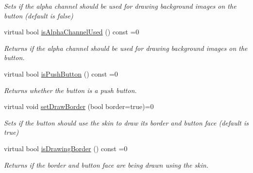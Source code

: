 \begin{DoxyCompactItemize}
\begin{DoxyCompactList}\small\item\em Sets if the alpha channel should be used for drawing background images on the button (default is false) \end{DoxyCompactList}\item 
\mbox{\label{classirr_1_1gui_1_1IGUIButton_af4cb47805f2a296506b8a0b4cb65fddf}} 
virtual bool \hyperlink{classirr_1_1gui_1_1IGUIButton_af4cb47805f2a296506b8a0b4cb65fddf}{is\+Alpha\+Channel\+Used} () const =0
\begin{DoxyCompactList}\small\item\em Returns if the alpha channel should be used for drawing background images on the button. \end{DoxyCompactList}\item 
\mbox{\label{classirr_1_1gui_1_1IGUIButton_abb12a92ba70d1fe738655d04ef73734f}} 
virtual bool \hyperlink{classirr_1_1gui_1_1IGUIButton_abb12a92ba70d1fe738655d04ef73734f}{is\+Push\+Button} () const =0
\begin{DoxyCompactList}\small\item\em Returns whether the button is a push button. \end{DoxyCompactList}\item 
\mbox{\label{classirr_1_1gui_1_1IGUIButton_aa6e68e5335f67472bde80b530b6d31fd}} 
virtual void \hyperlink{classirr_1_1gui_1_1IGUIButton_aa6e68e5335f67472bde80b530b6d31fd}{set\+Draw\+Border} (bool border=true)=0
\begin{DoxyCompactList}\small\item\em Sets if the button should use the skin to draw its border and button face (default is true) \end{DoxyCompactList}\item 
\mbox{\label{classirr_1_1gui_1_1IGUIButton_af2e1cee431cc5f90cede3820719625f1}} 
virtual bool \hyperlink{classirr_1_1gui_1_1IGUIButton_af2e1cee431cc5f90cede3820719625f1}{is\+Drawing\+Border} () const =0
\begin{DoxyCompactList}\small\item\em Returns if the border and button face are being drawn using the skin. \end{DoxyCompactList}\item 

\end{DoxyCompactItemize}
